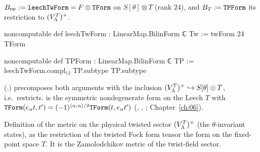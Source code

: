 \begin{definition}\label{ch09:def:TPForm}
$B_{\mathrm{tw}}:=\lean{leechTwForm}=F\otimes\lean{TForm}$ on $S[\theta]\otimes T$ (rank $24$),
and $B_T:=\lean{TPForm}$ its restriction to $(V_{\Lambda}^{T})^{+}$.
\end{definition}
\begin{leancode}
noncomputable def leechTwForm : LinearMap.BilinForm ℂ Tw := twForm 24 TForm

noncomputable def TPForm : LinearMap.BilinForm ℂ TP :=
  leechTwForm.compl₁₂ TP.subtype TP.subtype
\end{leancode}
(.)  precomposes both
arguments with the inclusion $(V_{\Lambda}^{T})^{+}\hookrightarrow S[\theta]\otimes T$, i.e.\ restricts.
 is the symmetric nondegenerate form on the Leech $T$ with
$\lean{TForm}(e_\alpha t,t')=(-1)^{\langle\alpha,\alpha\rangle/2}\lean{TForm}(t,e_\alpha t')$
(, , ; Chapter~\ref{ch:06}).

\begin{physics}
Definition of the metric on the physical twisted sector $(V_{\Lambda}^{T})^{+}$ (the $\theta$-invariant states), as the restriction of the twisted Fock form tensor the form on the fixed-point space $T$. It is the Zamolodchikov metric of the twist-field sector.
\end{physics}

